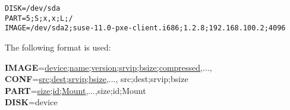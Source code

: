 \begin{verbatim}
DISK=/dev/sda
PART=5;S;x,x;L;/
IMAGE=/dev/sda2;suse-11.0-pxe-client.i686;1.2.8;192.168.100.2;4096
\end{verbatim}

The following format is used:

\begin{Command}{14cm}
    \textbf{IMAGE}=\underline{device;name;version;srvip;bsize;compressed},...,\\
    \textbf{CONF}=\underline{src;dest;srvip;bsize},...,
                             src;dest;srvip;bsize\\
    \textbf{PART}=\underline{size;id;Mount},...,size;id;Mount\\
    \textbf{DISK}=device
\end{Command}

